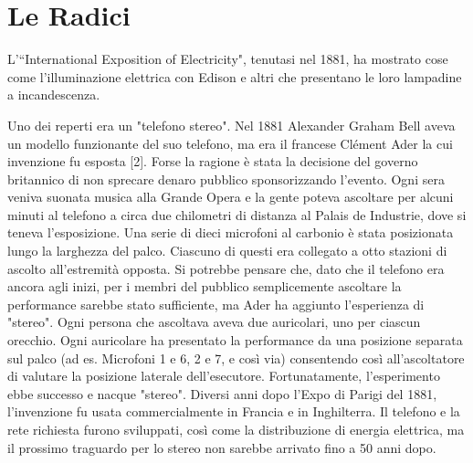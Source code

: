 \section{Le Radici}

L'“International Exposition of Electricity", tenutasi nel 1881, ha mostrato cose come l'illuminazione elettrica con Edison e altri che presentano le loro lampadine a incandescenza.

Uno dei reperti era un "telefono stereo". Nel 1881 Alexander Graham Bell aveva un modello funzionante del suo telefono, ma era il francese Clément Ader la cui invenzione fu esposta [2]. Forse la ragione è stata la decisione del governo britannico di non sprecare denaro pubblico sponsorizzando l'evento. Ogni sera veniva suonata musica alla Grande Opera e la gente poteva ascoltare per alcuni minuti al telefono a circa due chilometri di distanza al Palais de Industrie, dove si teneva l'esposizione. Una serie di dieci microfoni al carbonio è stata posizionata lungo la larghezza del palco. Ciascuno di questi era collegato a otto stazioni di ascolto all'estremità opposta. Si potrebbe pensare che, dato che il telefono era ancora agli inizi, per i membri del pubblico semplicemente ascoltare la performance sarebbe stato sufficiente, ma Ader ha aggiunto l'esperienza di "stereo". Ogni persona che ascoltava aveva due auricolari, uno per ciascun orecchio. Ogni auricolare ha presentato la performance da una posizione separata sul palco (ad es. Microfoni 1 e 6, 2 e 7, e così via) consentendo così all'ascoltatore di valutare la posizione laterale dell'esecutore. Fortunatamente, l'esperimento ebbe successo e nacque "stereo". Diversi anni dopo l'Expo di Parigi del 1881, l'invenzione fu usata commercialmente in Francia e in Inghilterra. Il telefono e la rete richiesta furono sviluppati, così come la distribuzione di energia elettrica, ma il prossimo traguardo per lo stereo non sarebbe arrivato fino a 50 anni dopo.

